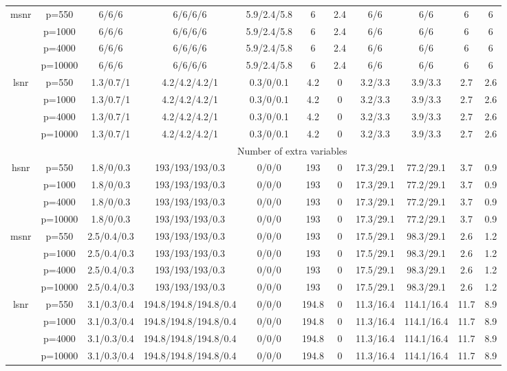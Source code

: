 \begin{table}[ht]
{\begin{tabular}{|c|c|ccccccccc|}
  \midrule\multirow{4}[2]{*}{msnr} & p=550 & 6/6/6 & 6/6/6/6 & 5.9/2.4/5.8 & 6 & 2.4 & 6/6 & 6/6 & 6 & 6 \\ 
   & p=1000 & 6/6/6 & 6/6/6/6 & 5.9/2.4/5.8 & 6 & 2.4 & 6/6 & 6/6 & 6 & 6 \\ 
   & p=4000 & 6/6/6 & 6/6/6/6 & 5.9/2.4/5.8 & 6 & 2.4 & 6/6 & 6/6 & 6 & 6 \\ 
   & p=10000 & 6/6/6 & 6/6/6/6 & 5.9/2.4/5.8 & 6 & 2.4 & 6/6 & 6/6 & 6 & 6 \\ 
  \midrule\multirow{4}[2]{*}{lsnr} & p=550 & 1.3/0.7/1 & 4.2/4.2/4.2/1 & 0.3/0/0.1 & 4.2 & 0 & 3.2/3.3 & 3.9/3.3 & 2.7 & 2.6 \\ 
   & p=1000 & 1.3/0.7/1 & 4.2/4.2/4.2/1 & 0.3/0/0.1 & 4.2 & 0 & 3.2/3.3 & 3.9/3.3 & 2.7 & 2.6 \\ 
   & p=4000 & 1.3/0.7/1 & 4.2/4.2/4.2/1 & 0.3/0/0.1 & 4.2 & 0 & 3.2/3.3 & 3.9/3.3 & 2.7 & 2.6 \\ 
   & p=10000 & 1.3/0.7/1 & 4.2/4.2/4.2/1 & 0.3/0/0.1 & 4.2 & 0 & 3.2/3.3 & 3.9/3.3 & 2.7 & 2.6 \\ 
   \midrule 
 \multicolumn{1}{|c}{} &       & \multicolumn{9}{c|}{Number of extra variables} \\
\midrule\multirow{4}[2]{*}{hsnr} & p=550 & 1.8/0/0.3 & 193/193/193/0.3 & 0/0/0 & 193 & 0 & 17.3/29.1 & 77.2/29.1 & 3.7 & 0.9 \\ 
   & p=1000 & 1.8/0/0.3 & 193/193/193/0.3 & 0/0/0 & 193 & 0 & 17.3/29.1 & 77.2/29.1 & 3.7 & 0.9 \\ 
   & p=4000 & 1.8/0/0.3 & 193/193/193/0.3 & 0/0/0 & 193 & 0 & 17.3/29.1 & 77.2/29.1 & 3.7 & 0.9 \\ 
   & p=10000 & 1.8/0/0.3 & 193/193/193/0.3 & 0/0/0 & 193 & 0 & 17.3/29.1 & 77.2/29.1 & 3.7 & 0.9 \\ 
  \midrule\multirow{4}[2]{*}{msnr} & p=550 & 2.5/0.4/0.3 & 193/193/193/0.3 & 0/0/0 & 193 & 0 & 17.5/29.1 & 98.3/29.1 & 2.6 & 1.2 \\ 
   & p=1000 & 2.5/0.4/0.3 & 193/193/193/0.3 & 0/0/0 & 193 & 0 & 17.5/29.1 & 98.3/29.1 & 2.6 & 1.2 \\ 
   & p=4000 & 2.5/0.4/0.3 & 193/193/193/0.3 & 0/0/0 & 193 & 0 & 17.5/29.1 & 98.3/29.1 & 2.6 & 1.2 \\ 
   & p=10000 & 2.5/0.4/0.3 & 193/193/193/0.3 & 0/0/0 & 193 & 0 & 17.5/29.1 & 98.3/29.1 & 2.6 & 1.2 \\ 
  \midrule\multirow{4}[2]{*}{lsnr} & p=550 & 3.1/0.3/0.4 & 194.8/194.8/194.8/0.4 & 0/0/0 & 194.8 & 0 & 11.3/16.4 & 114.1/16.4 & 11.7 & 8.9 \\ 
   & p=1000 & 3.1/0.3/0.4 & 194.8/194.8/194.8/0.4 & 0/0/0 & 194.8 & 0 & 11.3/16.4 & 114.1/16.4 & 11.7 & 8.9 \\ 
   & p=4000 & 3.1/0.3/0.4 & 194.8/194.8/194.8/0.4 & 0/0/0 & 194.8 & 0 & 11.3/16.4 & 114.1/16.4 & 11.7 & 8.9 \\ 
   & p=10000 & 3.1/0.3/0.4 & 194.8/194.8/194.8/0.4 & 0/0/0 & 194.8 & 0 & 11.3/16.4 & 114.1/16.4 & 11.7 & 8.9 \\ 
   \bottomrule 
\end{tabular}
}
\end{table}
